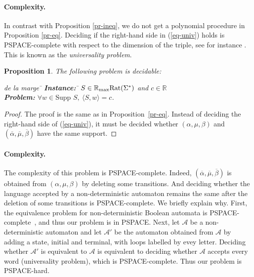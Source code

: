\documentclass{article}
\newtheorem{prpstn}[thrm]{Proposition}
\newcommand{\mrm}[1]{\text{\rm #1}}
\newcommand{\supp}[1]{\text{Supp }#1}
\def\cA{{\mathcal A}}
\newcommand{\R} {\ensuremath{\mathbb{R}}}
\newcommand{\Rmax} {\R_{\max}}
\newcommand{\1}{\mathbb{1}}
\newcommand{\0}{\mathbb{0}}
\newcommand{\coef}[2]{\langle #1, #2\rangle}
\def\ab{\Sigma}
\begin{document}
\paragraph{Complexity.}
In contrast with Proposition \ref{pr-ineq}, we do not get a polynomial
procedure in Proposition \ref{pr-eq}. 
Deciding if the right-hand side in (\ref{eq-univ}) holds is PSPACE-complete with respect to the
dimension of the triple, see for instance \cite[Theorem 13.14 and
  Exercise 13.25]{HoUl}.  This is known as 
the {\em universality problem}.


\begin{prpstn}
\label{pr-eq-part}
The following problem is decidable:
\begin{tabbing} 
de la marge \= \kill
\> {\bf Instance:} \hspace*{0.4cm} \= $S\in \Rmax\mrm{Rat}(\ab^*)$ and
$c\in \R$ \\
\>  {\bf Problem:} \> $\forall w\in \supp{S},  \ \coef{S}{w} = c$\;.
\end{tabbing}
\end{prpstn}
\begin{proof}
The proof is the same as in Proposition~\ref{pr-eq}.
Instead of deciding the right-hand side of (\ref{eq-univ}), it must be decided whether
$(\alpha,\mu,\beta)$ and $(\overline\alpha,\overline\mu,\overline\beta)$
have the same support.
\end{proof}

\paragraph{Complexity.}
The complexity of this problem is PSPACE-complete. 
Indeed, $(\overline\alpha,\overline\mu,\overline\beta)$ is obtained
from $(\alpha,\mu,\beta)$ by deleting some transitions. 
And deciding whether the language accepted by a non-deterministic automaton
remains the same after the deletion of some transitions is
PSPACE-complete. We briefly explain why. 
First, the equivalence problem for non-deterministic Boolean automata
is PSPACE-complete~\cite{StMe},
and thus our problem is in PSPACE.
Next, let $\cA$ be a non-deterministic automaton and
let $\cA'$ be the automaton obtained from $\cA$
by adding a state, initial and terminal, with loops labelled by evey letter.
Deciding whether $\cA'$ is equivalent to $\cA$ is equivalent
to deciding whether $\cA$ accepts every word (universality problem),
which is PSPACE-complete.
Thus our problem is PSPACE-hard.

\medskip
\end{document}
